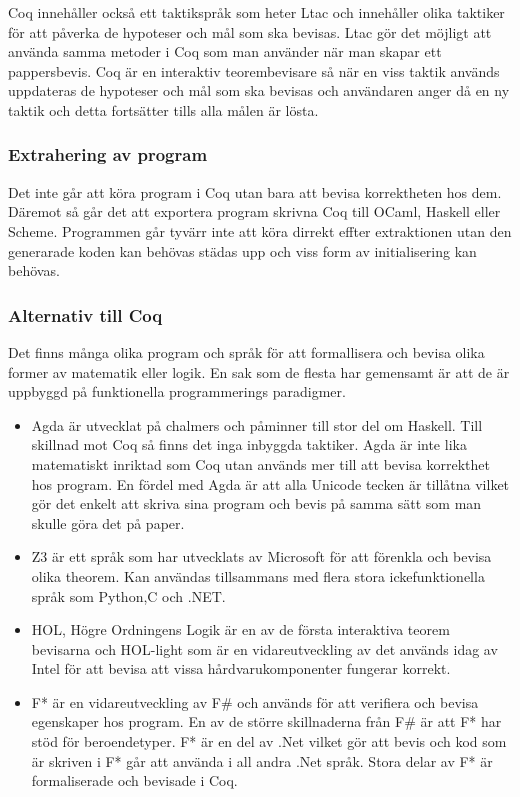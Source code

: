 Coq innehåller också ett taktikspråk som heter Ltac och innehåller olika
taktiker för att påverka de hypoteser och mål som ska bevisas. Ltac gör det
möjligt att använda samma metoder i Coq som man använder när man skapar ett
pappersbevis.
Coq är en interaktiv teorembevisare så när en viss taktik används uppdateras de
hypoteser och mål som ska bevisas och användaren anger då en ny taktik och
detta fortsätter tills alla målen är lösta.

\subsubsection{Extrahering av program}
Det inte går att köra program i Coq utan bara att bevisa korrektheten hos dem.
Däremot så går det att exportera program skrivna Coq till OCaml, Haskell eller
Scheme. Programmen går tyvärr inte att köra dirrekt effter extraktionen utan
den generarade koden kan behövas städas upp och viss form av initialisering kan
behövas.

\subsubsection{Alternativ till Coq}
Det finns många olika program och språk för att formallisera och bevisa olika
former av matematik eller logik. En sak som de flesta har gemensamt är att de
är uppbyggd på funktionella programmerings paradigmer.

\begin{itemize}
\item Agda är utvecklat på chalmers och påminner till stor del om Haskell. Till
skillnad mot Coq så finns det inga inbyggda taktiker.  Agda är inte lika
matematiskt inriktad som Coq utan används mer till att bevisa korrekthet hos
program. En fördel med Agda är att alla Unicode tecken är tillåtna vilket gör
det enkelt att skriva sina program och bevis på samma sätt som man skulle göra
det på paper.

\item Z3 är ett språk som har utvecklats av Microsoft för att förenkla och bevisa
olika theorem. Kan användas tillsammans med flera stora ickefunktionella språk
som Python,C och .NET.

\item HOL, Högre Ordningens Logik är en av de första interaktiva teorem bevisarna och
HOL-light som är en vidareutveckling av det används idag av Intel för att
bevisa att vissa hårdvarukomponenter fungerar korrekt.

\item F* är en vidareutveckling av F\# och används för att verifiera och bevisa
egenskaper hos program. En av de större skillnaderna från F\# är att F* har
stöd för beroendetyper. F* är en del av .Net vilket gör att bevis och kod som
är skriven i F* går att använda i all andra .Net språk. Stora delar av F* är
formaliserade och bevisade i Coq.
\end{itemize}

\begin{comment}
Källor och annat material
HOL http://www.cl.cam.ac.uk/~jrh13/hol-light/
Z3 http://research.microsoft.com/en-us/um/redmond/projects/z3/old/
F* http://research.microsoft.com/en-us/projects/fstar/
\end{comment}
